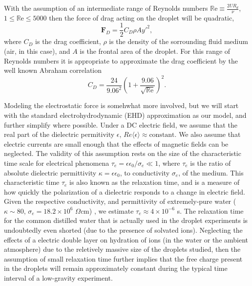 \documentclass[12pt,a4paper,oneside]{book}
\begin{document}
With the assumption of an intermediate range of Reynolds numbers $\mathbb{R}\mbox{e} \equiv \frac{2UR_d}{\nu}$, $1 \leq \mathbb{R}\mbox{e} \leq 5000 $ then the force of drag acting on the droplet will be quadratic,
\begin{equation*}\label{drag_force}
\mathbf{F}_D = \frac{1}{2}C_D \rho A {y'}^2,
\end{equation*}
where $C_D$ is the drag coefficient, $\rho$ is the density of the sorrounding fluid medium (air, in this case), and $A$ is the frontal area of the droplet. For this range of Reynolds numbers it is appropriate to approximate the drag coefficient by the well known Abraham correlation \cite{abraham_functional_1970}
\[C_D = \frac{24}{9.06^2} \left( 1 + \frac{9.06}{\sqrt{\mathbb{R}\mbox{e}}} \right)^2 .\]

Modeling the electrostatic force is somehwhat more involved, but we will start with the standard electrohydrodynamic (EHD) approximation \cite{saville_electrohydrodynamics:taylor-melcher_1997} as our model, and further simplify where possible. Under a DC electric field, we assume that the real part of the dielectric permitivity $\epsilon$, $Re \langle \epsilon \rangle \approx  \mbox{constant}$. We also assume that electric currents are small enough that the effects of magnetic fields can be neglected. The validity of this assumption rests on the size of the characteristic time scale for electrical phenomena $\tau_e = \epsilon \epsilon_0/\sigma_e \ll 1$, where $\tau_e$ is the ratio of absolute dielectric permittivity $\kappa = \epsilon \epsilon_0$, to conductivity $\sigma_e$, of the medium. This characteristic time $\tau_e$ is also known as the relaxation time, and is a measure of how quickly the polarization of a dielectric responds to a change in electric field. Given the respective conductivity, and permittivity of extremely-pure water ($ \kappa \sim 80$, $\sigma_e = 18.2 \times 10^{6}$ $\Omega\mbox{cm}$) \cite{yatsuzuka_electrification_1994}, we estimate $\tau_e \approx 4 \times 10^{-6}$ s. The relaxation time for the common distilled water that is actually used in the droplet experiments is undoubtedly even shorted (due to the presence of solvated ions). Neglecting the effects of a electric double layer on hydration of ions (in the water or the ambient atmosphere) due to the reletively massive size of the droplets studied, then the assumption of small relaxation time further implies that the free charge present in the droplets will remain approximately constant during the typical time interval of a low-gravity experiment.
\end{document}
